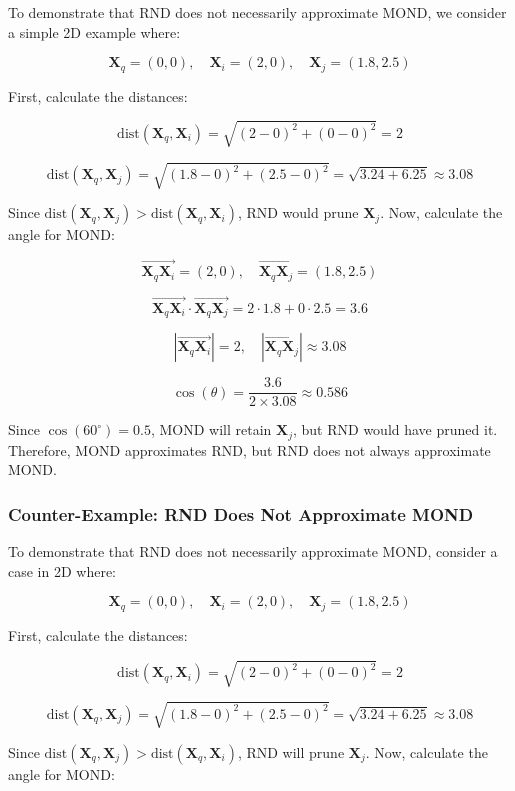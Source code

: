 To demonstrate that RND does not necessarily approximate MOND, we consider a simple 2D example where:

\[
\mathbf{X}_q = (0, 0), \quad \mathbf{X}_i = (2, 0), \quad \mathbf{X}_j = (1.8, 2.5)
\]

First, calculate the distances:

\[
\text{dist}(\mathbf{X}_q, \mathbf{X}_i) = \sqrt{(2 - 0)^2 + (0 - 0)^2} = 2
\]

\[
\text{dist}(\mathbf{X}_q, \mathbf{X}_j) = \sqrt{(1.8 - 0)^2 + (2.5 - 0)^2} = \sqrt{3.24 + 6.25} \approx 3.08
\]

Since \(\text{dist}(\mathbf{X}_q, \mathbf{X}_j) > \text{dist}(\mathbf{X}_q, \mathbf{X}_i)\), RND would prune \(\mathbf{X}_j\). Now, calculate the angle for MOND:

\[
\overrightarrow{\mathbf{X}_q \mathbf{X}_i} = (2, 0), \quad \overrightarrow{\mathbf{X}_q \mathbf{X}_j} = (1.8, 2.5)
\]

\[
\overrightarrow{\mathbf{X}_q \mathbf{X}_i} \cdot \overrightarrow{\mathbf{X}_q \mathbf{X}_j} = 2 \cdot 1.8 + 0 \cdot 2.5 = 3.6
\]

\[
|\overrightarrow{\mathbf{X}_q \mathbf{X}_i}| = 2, \quad |\overrightarrow{\mathbf{X}_q \mathbf{X}_j}| \approx 3.08
\]

\[
\cos(\theta) = \frac{3.6}{2 \times 3.08} \approx 0.586
\]

Since \( \cos(60^\circ) = 0.5 \), MOND will retain \(\mathbf{X}_j\), but RND would have pruned it. Therefore, MOND approximates RND, but RND does not always approximate MOND.



\subsubsection{Counter-Example: RND Does Not Approximate MOND}

To demonstrate that RND does not necessarily approximate MOND, consider a case in 2D where:

\[
\mathbf{X}_q = (0, 0), \quad \mathbf{X}_i = (2, 0), \quad \mathbf{X}_j = (1.8, 2.5)
\]

First, calculate the distances:

\[
\text{dist}(\mathbf{X}_q, \mathbf{X}_i) = \sqrt{(2 - 0)^2 + (0 - 0)^2} = 2
\]

\[
\text{dist}(\mathbf{X}_q, \mathbf{X}_j) = \sqrt{(1.8 - 0)^2 + (2.5 - 0)^2} = \sqrt{3.24 + 6.25} \approx 3.08
\]

Since \(\text{dist}(\mathbf{X}_q, \mathbf{X}_j) > \text{dist}(\mathbf{X}_q, \mathbf{X}_i)\), RND will prune \(\mathbf{X}_j\). Now, calculate the angle for MOND:

